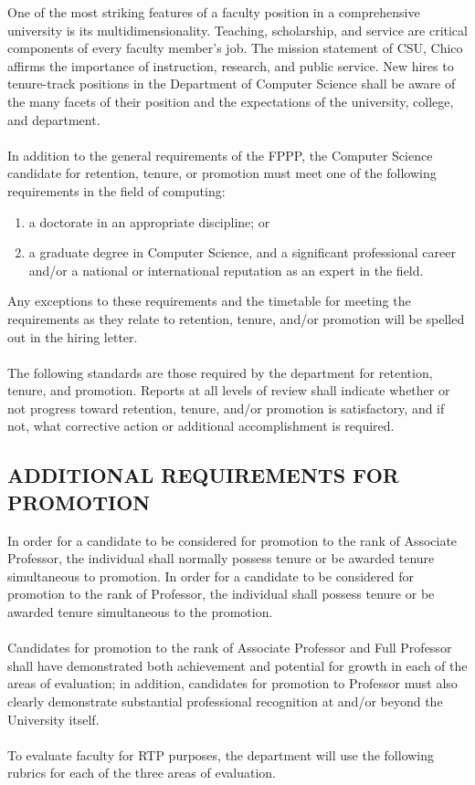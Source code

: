 \documentclass{scrartcl}
\begin{document}
One of the most striking features of a faculty position in a comprehensive university is its multidimensionality. Teaching, scholarship, and service are critical components of every faculty member’s job. The mission statement of CSU, Chico affirms the importance of instruction, research, and public service. New hires to tenure-track positions in the Department of Computer Science shall be aware of the many facets of their position and the expectations of the university, college, and department.
\\\\
In addition to the general requirements of the FPPP, the Computer Science candidate for retention, tenure, or promotion must meet one of the following requirements in the field of computing:

\begin{enumerate}
\item a doctorate in an appropriate discipline; or
\item a graduate degree in Computer Science, and a significant professional career and/or a national or international reputation as an expert in the field.
\end{enumerate}

Any exceptions to these requirements and the timetable for meeting the requirements as they relate to retention, tenure, and/or promotion will be spelled out in the hiring letter.
\\\\
The following standards are those required by the department for retention, tenure, and promotion. Reports at all levels of review shall indicate whether or not progress toward retention, tenure, and/or promotion is satisfactory, and if not, what corrective action or additional accomplishment is required.


\subsection{ADDITIONAL REQUIREMENTS FOR PROMOTION}

In order for a candidate to be considered for promotion to the rank of Associate Professor, the individual shall normally possess tenure or be awarded tenure simultaneous to promotion. In order for a candidate to be considered for promotion to the rank of Professor, the individual shall possess tenure or be awarded tenure simultaneous to the promotion.
\\\\
Candidates for promotion to the rank of Associate Professor and Full Professor shall have demonstrated both achievement and potential for growth in each of the areas of evaluation; in addition, candidates for promotion to Professor must also clearly demonstrate substantial professional recognition at and/or beyond the University itself.
\\\\
To evaluate faculty for RTP purposes, the department will use the following rubrics for each of the three areas of evaluation.
\end{document}

